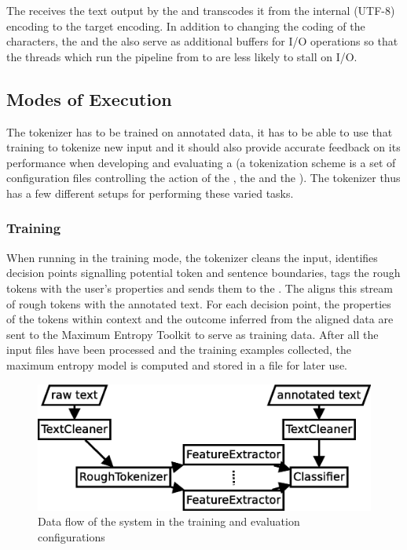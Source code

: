 The  receives the text output by the  and
transcodes it from the internal (UTF-8) encoding to the target encoding. In
addition to changing the coding of the characters, the  and the
 also serve as additional buffers for I/O operations so that
the threads which run the pipeline from  to
 are less likely to stall on I/O.


\subsection{Modes of Execution}
\label{sec:impl-modes}

The tokenizer has to be trained on annotated data, it has to be able to use
that training to tokenize new input and it should also provide accurate
feedback on its performance when developing and evaluating a
 (a tokenization scheme is a set of configuration
files controlling the action of the , the
 and the ). The tokenizer thus has a
few different setups for performing these varied tasks.

\subsubsection{Training}
\label{ssec:impl-modes-train}

When running in the training mode, the tokenizer cleans the input, identifies
decision points signalling potential token and sentence boundaries, tags the
rough tokens with the user's properties and sends them to the
. The  aligns this stream of rough tokens
with the annotated text. For each decision point, the properties of the tokens
within context and the outcome inferred from the aligned data are sent to the
Maximum Entropy Toolkit to serve as training data. After all the input files
have been processed and the training examples collected, the maximum entropy
model is computed and stored in a file for later use.

\begin{figure}
  \begin{center}
    \includegraphics[width=\textwidth]{img/train-parts.eps}
    \caption{Data flow of the system in the training and evaluation
             configurations}
    \label{fig:train-parts}
  \end{center}
\end{figure}

